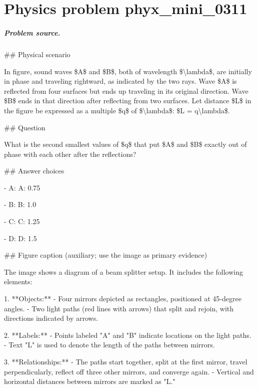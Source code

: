 
\chapter{Physics problem phyx\_mini\_0311}
\label{ch:PhyXMiniProblems_problem_phyx_mini_0311}

\paragraph{Problem source.}
\#\# Physical scenario

In figure, sound waves \$A\$ and \$B\$, both of wavelength \$\textbackslash{}lambda\$, are initially in phase and traveling rightward, as indicated by the two rays. Wave \$A\$ is reflected from four surfaces but ends up traveling in its original direction. Wave \$B\$ ends in that direction after reflecting from two surfaces. Let distance \$L\$ in the figure be expressed as a multiple \$q\$ of \$\textbackslash{}lambda\$: \$L = q\textbackslash{}lambda\$.

\#\# Question

What is the second smallest values of \$q\$ that put \$A\$ and \$B\$ exactly out of phase with each other after the reflections?

\#\# Answer choices

- A: A: 0.75

- B: B: 1.0

- C: C: 1.25

- D: D: 1.5

\#\# Figure caption (auxiliary; use the image as primary evidence)

The image shows a diagram of a beam splitter setup. It includes the following elements:

1. **Objects:**
   - Four mirrors depicted as rectangles, positioned at 45-degree angles.
   - Two light paths (red lines with arrows) that split and rejoin, with directions indicated by arrows.

2. **Labels:**
   - Points labeled "A" and "B" indicate locations on the light paths.
   - Text "L" is used to denote the length of the paths between mirrors.
   
3. **Relationships:**
   - The paths start together, split at the first mirror, travel perpendicularly, reflect off three other mirrors, and converge again.
   - Vertical and horizontal distances between mirrors are marked as "L."

